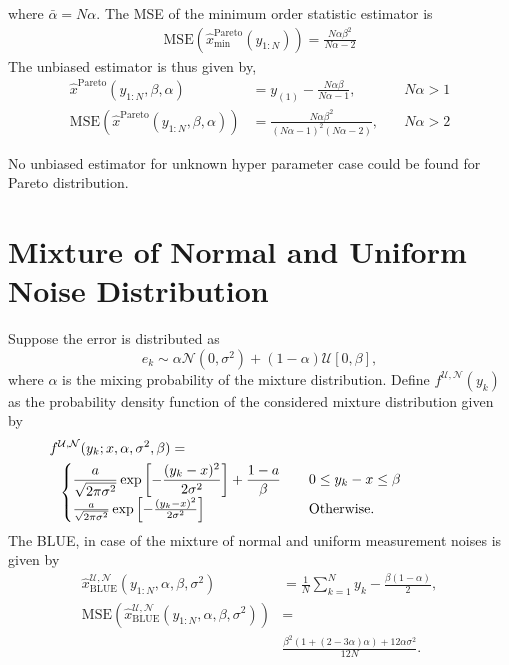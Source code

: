 \documentclass{article}
\newcommand{\MSE}{\mathrm{MSE}}
\begin{document}
%
%
where $\bar{\alpha}=N\alpha$. The MSE of the minimum order statistic estimator is 
%
%
\begin{align}
\MSE(\hat{x}_{\mathrm{min}}^{\mathrm{Pareto}}(y_{1:N})) =  \frac{N\alpha\beta^2}{N\alpha-2}
\end{align}
%
%
The unbiased estimator is thus given by,
%
%
\begin{subequations}
	\begin{align}
	\hat{x}^{\mathrm{Pareto}}(y_{1:N},\beta,\alpha) &= y_{(1)} - \frac{N\alpha\beta}{N\alpha-1},&\quad N\alpha>1
	\\
	\MSE(\hat{x}^{\mathrm{Pareto}}(y_{1:N},\beta,\alpha)) &=\frac{N\alpha\beta^2}{(N\alpha-1)^2(N\alpha-2)},&\quad N\alpha>2
	\end{align}
\end{subequations}
%
%

No unbiased estimator for unknown hyper parameter case could be found for Pareto distribution. 
\section{Mixture of Normal and Uniform Noise Distribution} 
Suppose the error is distributed as \[ e_k\sim \alpha\mathcal{N}(0,\sigma^2) + (1-\alpha) \mathcal{U}[0,\beta],\] where $\alpha$ is the mixing probability of the mixture distribution. Define $f^{\mathrm{\mathcal{U},\mathcal{N}}}(y_k)$ as the probability density function of the considered mixture distribution given by
%
%
\begin{align}\label{eq:mixture_pdf}
f&^{\mathrm{\mathcal{U},\mathcal{N}}}(y_k;x,\alpha,\sigma^2,\beta) =\nonumber\\
&\begin{cases}
\begin{aligned}
& \frac{a}{\sqrt{2\pi\sigma^2}}\exp\left[-\frac{(y_k-x)^2}{2\sigma^2}\right] +\frac{1-a}{\beta}		\end{aligned} & \parbox[t]{4cm}{\raggedright $0\leq y_k-x\leq \beta$}\\
\frac{a}{\sqrt{2\pi\sigma^2}}\exp\left[-\frac{(y_k-x)^2}{2\sigma^2}\right] & \parbox[t]{4cm}{\raggedright Otherwise.}\\
\end{cases} 
\end{align}
%
%
The BLUE, in case of the mixture of normal and uniform measurement noises is given by
%
%
\begin{subequations}
	\begin{align}
	\hat{x}_{\mathrm{BLUE}}^{\mathrm{\mathrm{\mathcal{U},\mathcal{N}}}}(y_{1:N},\alpha,\beta,\sigma^2) &= \frac{1}{N}\sum_{k=1}^{N}y_k - \frac{\beta(1-\alpha)}{2},
	\\
	\MSE\left(\hat{x}_{\mathrm{BLUE}}^{\mathrm{\mathrm{\mathcal{U},\mathcal{N}}}}(y_{1:N},\alpha,\beta,\sigma^2)\right) &=\nonumber\\ &\frac{\beta^2  \left(1+(2-3\alpha)\alpha\right)+12\alpha\sigma^2}{12N}.
	\end{align}
\end{subequations}
\end{document}
